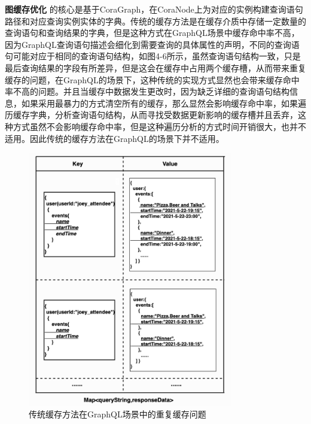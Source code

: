 \documentclass[winfonts,master,twoside]{njuthesis}
\begin{document}
\textbf{图缓存优化} 的核心是基于CoraGraph，在CoraNode上为对应的实例构建查询语句路径和对应查询实例实体的字典。传统的缓存方法是在缓存介质中存储一定数量的查询语句和查询结果的字典，但是这种方式在GraphQL场景中缓存命中率不高，因为GraphQL查询语句描述会细化到需要查询的具体属性的声明，不同的查询语句可能对应于相同的查询语句结构，如图4-6所示，虽然查询语句结构一致，只是最后查询结果的字段有所差异，但是这会在缓存中占用两个缓存槽，从而带来重复缓存的问题，在GraphQL的场景下，这种传统的实现方式显然也会带来缓存命中率不高的问题。并且当缓存中数据发生更改时，因为缺乏详细的查询语句结构信息，如果采用最暴力的方式清空所有的缓存，那么显然会影响缓存命中率，如果遍历缓存字典，分析查询语句结构，从而寻找受数据更新影响的缓存槽并且丢弃，这种方式虽然不会影响缓存命中率，但是这种遍历分析的方式时间开销很大，也并不适用。因此传统的缓存方法在GraphQL的场景下并不适用。
\begin{figure}
	\centering
	\includegraphics[width=0.8\textwidth]{figure/4-cora/repetitive_cache.png}
	\caption{传统缓存方法在GraphQL场景中的重复缓存问题}
	\label{ontransact-impl}
\end{figure}
\end{document}

